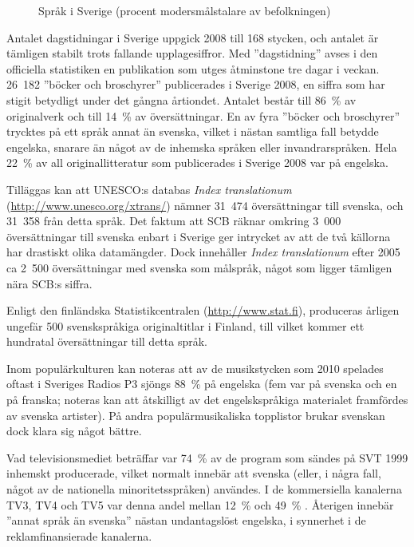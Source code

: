 \begin{multicols}{2}
\begin{figure}[htb]
\begin{tabular}{lrlr}
\end{tabular}
\caption{Språk i Sverige (procent modersmålstalare av befolkningen)}
\label{fig:swedish_langs_sv}
\end{figure}

Antalet dagstidningar i Sverige uppgick 2008 till 168 stycken, och
antalet är tämligen stabilt trots fallande upplagesiffror. Med
  ''dagstidning'' avses i den officiella statistiken en publikation som
  utges åtminstone tre dagar i veckan. 26~182 ''böcker och
broschyrer'' publicerades i Sverige 2008, en siffra som har stigit
betydligt under det gångna årtiondet. Antalet består till 86~\% av
originalverk och till 14~\% av översättningar. En av fyra ''böcker och
broschyrer'' trycktes på ett språk annat än svenska, vilket i nästan
samtliga fall betydde engelska, snarare än något av de inhemska
språken eller invandrarspråken. Hela 22~\% av all
originallitteratur som publicerades i Sverige 2008 var på engelska.

Tilläggas kan att UNESCO:s databas \textit{Index
  translationum} (\url{http://www.unesco.org/xtrans/}) nämner 31~474
översättningar till svenska, och 31~358 från detta språk. Det faktum
att SCB räknar omkring 3~000 översättningar till svenska enbart i
Sverige ger intrycket av att de två källorna har drastiskt olika
datamängder. Dock innehåller \textit{Index translationum} efter 2005
ca 2~500 översättningar med svenska som målspråk, något som ligger
tämligen nära SCB:s siffra.

Enligt den finländska Statistikcentralen (\url{http://www.stat.fi}),
produceras årligen ungefär 500 svenskspråkiga originaltitlar i
Finland, till vilket kommer ett hundratal översättningar till detta
språk.

Inom populärkulturen kan noteras att av de musikstycken som 2010
spelades oftast i Sveriges Radios P3\cite{p3}
sjöngs 88~\% på engelska (fem var på svenska och en på franska;
noteras kan att åtskilligt av det engelskspråkiga materialet
framfördes av svenska artister). På andra populärmusikaliska
topplistor brukar svenskan dock klara sig något bättre.

Vad televisionsmediet beträffar var 74~\% av de program som sändes på
SVT 1999 inhemskt producerade, vilket normalt innebär att svenska
(eller, i några fall, något av de nationella minoritetsspråken)
användes. I de kommersiella kanalerna TV3, TV4 och TV5 var denna andel
mellan 12~\% och 49~\% \cite[79]{falk2001}. Återigen innebär ''annat språk
än svenska'' nästan undantagslöst engelska, i synnerhet i de
reklamfinansierade kanalerna.


\end{multicols}
